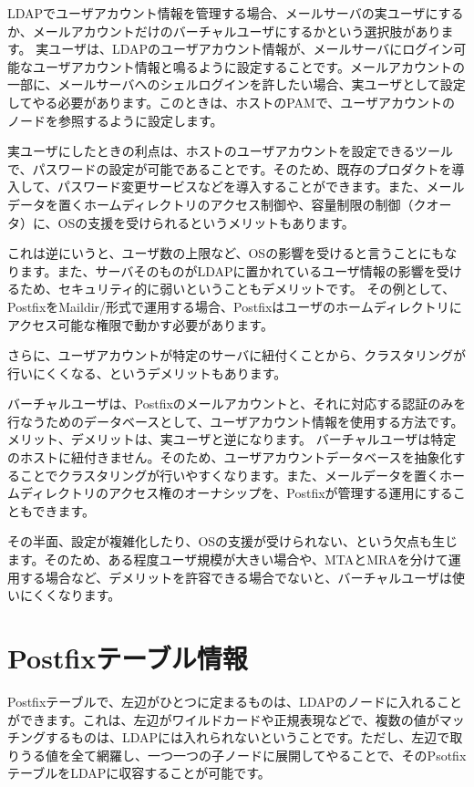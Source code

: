 LDAPでユーザアカウント情報を管理する場合、メールサーバの実ユーザにするか、メールアカウントだけのバーチャルユーザにするかという選択肢があります。
実ユーザは、LDAPのユーザアカウント情報が、メールサーバにログイン可能なユーザアカウント情報と鳴るように設定することです。メールアカウントの一部に、メールサーバへのシェルログインを許したい場合、実ユーザとして設定してやる必要があります。このときは、ホストのPAMで、ユーザアカウントのノードを参照するように設定します。

実ユーザにしたときの利点は、ホストのユーザアカウントを設定できるツールで、パスワードの設定が可能であることです。そのため、既存のプロダクトを導入して、パスワード変更サービスなどを導入することができます。また、メールデータを置くホームディレクトリのアクセス制御や、容量制限の制御（クオータ）に、OSの支援を受けられるというメリットもあります。

これは逆にいうと、ユーザ数の上限など、OSの影響を受けると言うことにもなります。また、サーバそのものがLDAPに置かれているユーザ情報の影響を受けるため、セキュリティ的に弱いということもデメリットです。
その例として、PostfixをMaildir/形式で運用する場合、Postfixはユーザのホームディレクトリにアクセス可能な権限で動かす必要があります。

さらに、ユーザアカウントが特定のサーバに紐付くことから、クラスタリングが行いにくくなる、というデメリットもあります。


バーチャルユーザは、Postfixのメールアカウントと、それに対応する認証のみを行なうためのデータベースとして、ユーザアカウント情報を使用する方法です。メリット、デメリットは、実ユーザと逆になります。
バーチャルユーザは特定のホストに紐付きません。そのため、ユーザアカウントデータベースを抽象化することでクラスタリングが行いやすくなります。また、メールデータを置くホームディレクトリのアクセス権のオーナシップを、Postfixが管理する運用にすることもできます。

その半面、設定が複雑化したり、OSの支援が受けられない、という欠点も生じます。そのため、ある程度ユーザ規模が大きい場合や、MTAとMRAを分けて運用する場合など、デメリットを許容できる場合でないと、バーチャルユーザは使いにくくなります。


\section{Postfixテーブル情報}

Postfixテーブルで、左辺がひとつに定まるものは、LDAPのノードに入れることができます。これは、左辺がワイルドカードや正規表現などで、複数の値がマッチングするものは、LDAPには入れられないということです。ただし、左辺で取りうる値を全て網羅し、一つ一つの子ノードに展開してやることで、そのPsotfixテーブルをLDAPに収容することが可能です。

